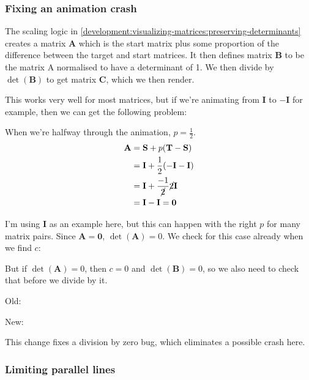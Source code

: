 \documentclass[../development.tex]{subfiles}
\begin{document}
\subsubsection{Fixing an animation crash\label{development:fixing-bugs-and-adding-polish:fixing-an-animation-crash}}

The scaling logic in \ref{development:visualizing-matrices:preserving-determinants} creates a matrix $\mathbf{A}$ which is the start matrix plus some proportion of the difference between the target and start matrices. It then defines matrix $\mathbf{B}$ to be the matrix A normalised to have a determinant of 1. We then divide by $\det(\mathbf{B})$ to get matrix $\mathbf{C}$, which we then render.

This works very well for most matrices, but if we're animating from $\mathbf{I}$ to $-\mathbf{I}$ for example, then we can get the following problem:

When we're halfway through the animation, $p = \frac{1}{2}$.
\begin{align*}
\mathbf{A} &= \mathbf{S} + p (\mathbf{T} - \mathbf{S})\\
&= \mathbf{I} + \frac{1}{2} (-\mathbf{I} - \mathbf{I})\\
&= \mathbf{I} + \frac{-1}{\cancel{2}} \cancel{2} \mathbf{I}\\
&= \mathbf{I} - \mathbf{I} = \mathbf{0}
\end{align*}

I'm using $\mathbf{I}$ as an example here, but this can happen with the right $p$ for many matrix pairs. Since $\mathbf{A} = \mathbf{0}$, $\det(\mathbf{A}) = 0$. We check for this case already when we find $c$:


But if $\det(\mathbf{A}) = 0$, then $c = 0$ and $\det(\mathbf{B}) = 0$, so we also need to check that before we divide by it.

Old:


New:


This change fixes a division by zero bug, which eliminates a possible crash here.

\subsubsection{Limiting parallel lines\label{development:fixing-bugs-and-adding-polish:limiting-parallel-lines}}
\end{document}
